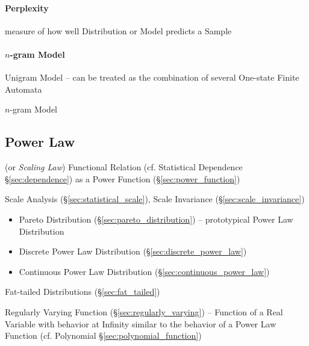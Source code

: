 \paragraph{Perplexity}\label{sec:perplexity}\hfill

measure of how well Distribution or Model predicts a Sample




\paragraph{$n$-gram Model}\label{sec:ngram_model}\hfill

Unigram Model -- can be treated as the combination of several One-state Finite
Automata

$n$-gram Model



\subsection{Power Law}\label{sec:power_law}

(or \emph{Scaling Law}) Functional Relation (cf. Statistical Dependence
\S\ref{sec:dependence}) as a Power Function (\S\ref{sec:power_function})

Scale Analysis (\S\ref{sec:statistical_scale}), Scale Invariance
(\S\ref{sec:scale_invariance})

\begin{itemize}
  \item Pareto Distribution (\S\ref{sec:pareto_distribution}) -- prototypical
    Power Law Distribution
  \item Discrete Power Law Distribution (\S\ref{sec:discrete_power_law})
  \item Continuous Power Law Distribution (\S\ref{sec:continuous_power_law})
\end{itemize}

\fist Fat-tailed Distributions (\S\ref{sec:fat_tailed})

\fist Regularly Varying Function (\S\ref{sec:regularly_varying}) -- Function of
a Real Variable with behavior at Infinity similar to the behavior of a Power Law
Function (cf. Polynomial \S\ref{sec:polynomial_function})



